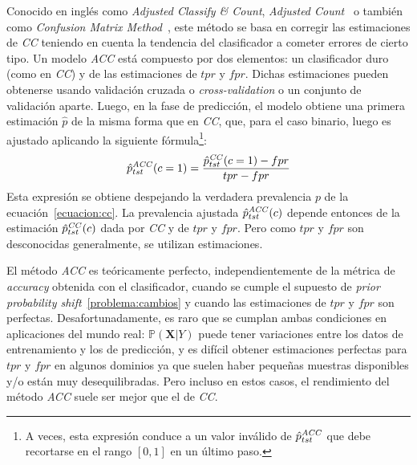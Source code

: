Conocido en inglés como {\it Adjusted Classify \& Count}, {\it Adjusted
Count\/}~\cite{forman2008quantifying} o también como {\it Confusion Matrix
Method\/}~\cite{saerens2002adjusting}, este método se basa en corregir las
estimaciones de {\it CC\/} teniendo en cuenta la tendencia del clasificador a
cometer errores de cierto tipo. Un modelo {\it ACC\/} está compuesto por dos
elementos: un clasificador duro (como en {\it CC\/}) y de las estimaciones de
$tpr$ y $fpr$. Dichas estimaciones pueden obtenerse usando validación cruzada o
{\it cross-validation\/} o un conjunto de validación aparte. Luego, en la fase
de predicción, el modelo obtiene una primera estimación $\hat p$ de la misma
forma que en {\it CC}, que, para el caso binario, luego es ajustado aplicando la
siguiente fórmula\footnote{A veces, esta expresión conduce a un valor inválido
de $\hat p^{\it{ACC}}_{tst}$ que debe recortarse en el rango $[0, 1]$ en un
último paso.}:
\begin{equation}
    \hat p^{\it{ACC}}_{tst}(c=1) = \frac{\hat p^{\it{CC}}_{tst}(c=1)-fpr}{tpr-fpr}\label{ecuacion:acc_binaria}
\end{equation}
Esta expresión se obtiene despejando la verdadera prevalencia $p$ de la
ecuación~\ref{ecuacion:cc}. La prevalencia ajustada $\hat p^{\it{ACC}}_{tst}(c)$
depende entonces de la estimación $\hat p^{\it{CC}}_{tst}(c)$ dada por {\it
CC\/} y de $tpr$ y $fpr$. Pero como $tpr$ y $fpr$ son desconocidas generalmente,
se utilizan estimaciones.

El método {\it ACC\/} es teóricamente perfecto, independientemente de la métrica
de {\it accuracy\/} obtenida con el clasificador, cuando se cumple el supuesto
de {\it prior probability shift\/}~\ref{problema:cambios} y cuando las
estimaciones de $tpr$ y $fpr$ son perfectas. Desafortunadamente, es raro que se
cumplan ambas condiciones en aplicaciones del mundo real:
$\mathbb{P}(\boldsymbol{X}|Y)$ puede tener variaciones entre los datos de
entrenamiento y los de predicción, y es difícil obtener estimaciones perfectas
para $tpr$ y $fpr$ en algunos dominios ya que suelen haber pequeñas muestras
disponibles y/o están muy desequilibradas. Pero incluso en estos casos, el
rendimiento del método {\it ACC\/} suele ser mejor que el de {\it CC}.

